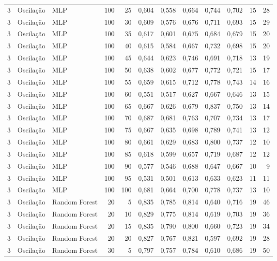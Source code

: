 \begin{longtable}{@{}rllrrrrrrrrr@{}}
3 & Oscilação & MLP & 100 & 25 & 0,604 & 0,558 & 0,664 & 0,744 & 0,702 & 15 & 28 \\
3 & Oscilação & MLP & 100 & 30 & 0,609 & 0,576 & 0,676 & 0,711 & 0,693 & 15 & 29 \\
3 & Oscilação & MLP & 100 & 35 & 0,617 & 0,601 & 0,675 & 0,684 & 0,679 & 15 & 20 \\
3 & Oscilação & MLP & 100 & 40 & 0,615 & 0,584 & 0,667 & 0,732 & 0,698 & 15 & 20 \\
3 & Oscilação & MLP & 100 & 45 & 0,644 & 0,623 & 0,746 & 0,691 & 0,718 & 13 & 19 \\
3 & Oscilação & MLP & 100 & 50 & 0,638 & 0,602 & 0,677 & 0,772 & 0,721 & 15 & 17 \\
3 & Oscilação & MLP & 100 & 55 & 0,659 & 0,615 & 0,712 & 0,778 & 0,743 & 14 & 16 \\
3 & Oscilação & MLP & 100 & 60 & 0,551 & 0,517 & 0,627 & 0,667 & 0,646 & 13 & 15 \\
3 & Oscilação & MLP & 100 & 65 & 0,667 & 0,626 & 0,679 & 0,837 & 0,750 & 13 & 14 \\
3 & Oscilação & MLP & 100 & 70 & 0,687 & 0,681 & 0,763 & 0,707 & 0,734 & 13 & 17 \\
3 & Oscilação & MLP & 100 & 75 & 0,667 & 0,635 & 0,698 & 0,789 & 0,741 & 13 & 12 \\
3 & Oscilação & MLP & 100 & 80 & 0,661 & 0,629 & 0,683 & 0,800 & 0,737 & 12 & 10 \\
3 & Oscilação & MLP & 100 & 85 & 0,618 & 0,599 & 0,657 & 0,719 & 0,687 & 12 & 12 \\
3 & Oscilação & MLP & 100 & 90 & 0,577 & 0,546 & 0,688 & 0,647 & 0,667 & 10 & 9 \\
3 & Oscilação & MLP & 100 & 95 & 0,531 & 0,501 & 0,613 & 0,633 & 0,623 & 11 & 11 \\
3 & Oscilação & MLP & 100 & 100 & 0,681 & 0,664 & 0,700 & 0,778 & 0,737 & 13 & 10 \\
3 & Oscilação & Random Forest & 20 & 5 & 0,835 & 0,785 & 0,814 & 0,640 & 0,716 & 19 & 46 \\
3 & Oscilação & Random Forest & 20 & 10 & 0,829 & 0,775 & 0,814 & 0,619 & 0,703 & 19 & 36 \\
3 & Oscilação & Random Forest & 20 & 15 & 0,835 & 0,790 & 0,800 & 0,660 & 0,723 & 19 & 34 \\
3 & Oscilação & Random Forest & 20 & 20 & 0,827 & 0,767 & 0,821 & 0,597 & 0,692 & 19 & 28 \\
3 & Oscilação & Random Forest & 30 & 5 & 0,797 & 0,757 & 0,784 & 0,610 & 0,686 & 19 & 50 \\

\end{longtable}
